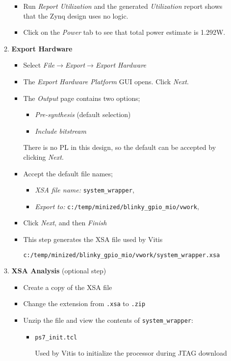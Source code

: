\begin{enumerate}
\begin{enumerate}
\begin{itemize}
\item Run \emph{Report Utilization} and the generated \emph{Utilization} 
report shows that the Zynq design uses no logic.
\item Click on the \emph{Power} tab to see that total power estimate is 1.292W.
\end{itemize}
%
\item {\bf Export Hardware}
%
\begin{itemize}
\item Select \emph{File}$\rightarrow$\emph{Export}$\rightarrow$\emph{Export Hardware}
\item The \emph{Export Hardware Platform} GUI opens. Click \emph{Next}.
\item The \emph{Output} page contains two options;
\begin{itemize}
\item \emph{Pre-synthesis} (default selection) 
\item \emph{Include bitstream}
\end{itemize}
There is no PL in this design, so the default can be accepted by
clicking \emph{Next}.
\item Accept the default file names; 
\begin{itemize}
\item \emph{XSA file name:} \verb+system_wrapper+,
\item \emph{Export to:} \verb+c:/temp/minized/blinky_gpio_mio/vwork+,
\end{itemize}
\item Click \emph{Next}, and then \emph{Finish}
\item This step generates the XSA file used by Vitis
%
\begin{verbatim}
c:/temp/minized/blinky_gpio_mio/vwork/system_wrapper.xsa
\end{verbatim}
\end{itemize}
%
\newpage
\item {\bf XSA Analysis} (optional step)
%
\begin{itemize}
\item Create a copy of the XSA file
\item Change the extension from \verb+.xsa+ to \verb+.zip+
\item Unzip the file and view the contents of \verb+system_wrapper+:
\begin{itemize}
\item \verb+ps7_init.tcl+

Used by Vitis to initialize the processor during JTAG download


\end{itemize}
\end{itemize}
\end{enumerate}
\end{enumerate}
